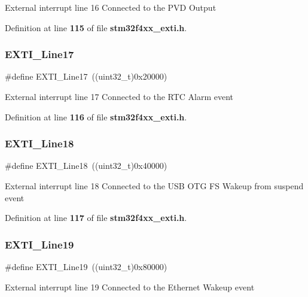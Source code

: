 External interrupt line 16 Connected to the P\+VD Output 

Definition at line \textbf{ 115} of file \textbf{ stm32f4xx\+\_\+exti.\+h}.

\mbox{\label{group__EXTI__Lines_ga3e0fc18bc0722adc09605e3093b24c6a}} 
\subsubsection{E\+X\+T\+I\+\_\+\+Line17}
{\footnotesize\ttfamily \#define E\+X\+T\+I\+\_\+\+Line17~((uint32\+\_\+t)0x20000)}

External interrupt line 17 Connected to the R\+TC Alarm event 

Definition at line \textbf{ 116} of file \textbf{ stm32f4xx\+\_\+exti.\+h}.

\mbox{\label{group__EXTI__Lines_ga6cdf346a3e7a3c8dbb036aca6741207c}} 
\subsubsection{E\+X\+T\+I\+\_\+\+Line18}
{\footnotesize\ttfamily \#define E\+X\+T\+I\+\_\+\+Line18~((uint32\+\_\+t)0x40000)}

External interrupt line 18 Connected to the U\+SB O\+TG FS Wakeup from suspend event 

Definition at line \textbf{ 117} of file \textbf{ stm32f4xx\+\_\+exti.\+h}.

\mbox{\label{group__EXTI__Lines_ga49ac0744621f88d432d85838483ad1de}} 
\subsubsection{E\+X\+T\+I\+\_\+\+Line19}
{\footnotesize\ttfamily \#define E\+X\+T\+I\+\_\+\+Line19~((uint32\+\_\+t)0x80000)}

External interrupt line 19 Connected to the Ethernet Wakeup event 

